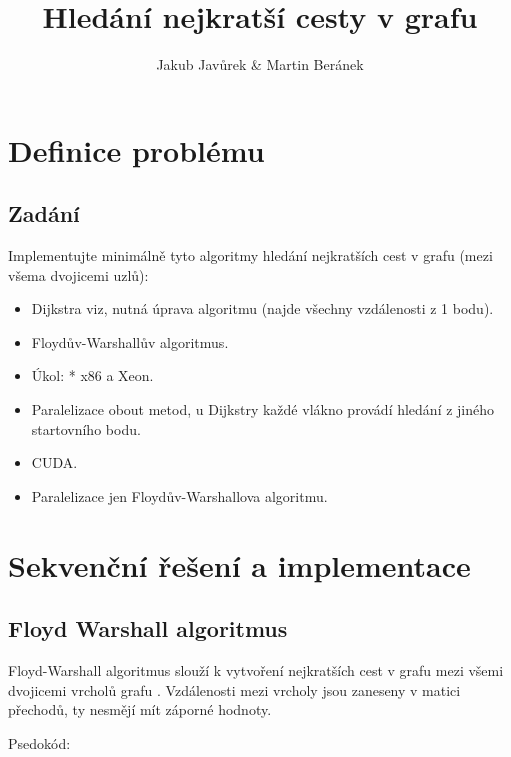 \documentclass[a4paper,10pt]{article}
\begin{document}
\title{Hledání nejkratší cesty v grafu}
\author{Jakub Javůrek \& Martin Beránek}
\maketitle

\tableofcontents
\listoffigures

\newpage

\section{Definice problému}

\subsection{Zadání}

Implementujte minimálně tyto algoritmy hledání nejkratších cest v grafu (mezi všema dvojicemi uzlů):
\begin{itemize}
    \item Dijkstra viz, nutná úprava algoritmu (najde všechny vzdálenosti z 1 bodu).
    \item Floydův-Warshallův algoritmus.
    \item Úkol: * x86 a Xeon.
\end{itemize}

\begin{itemize}
    \item Paralelizace obout metod, u Dijkstry každé vlákno provádí hledání z jiného startovního bodu.
    \item CUDA.
    \item Paralelizace jen Floydův-Warshallova algoritmu.
\end{itemize}

\section{Sekvenční řešení a implementace}

\subsection{Floyd Warshall algoritmus}

Floyd-Warshall algoritmus slouží k vytvoření nejkratších cest v grafu mezi všemi dvojicemi vrcholů grafu \cite{floydWarsh}. Vzdálenosti mezi vrcholy jsou zaneseny v matici přechodů, ty nesmějí mít záporné hodnoty.

Psedokód:
\end{document}
